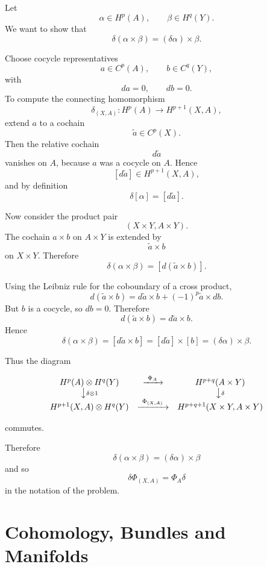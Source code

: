 \begin{solution}
Let
\[
\alpha\in H^p(A),
\qquad
\beta\in H^q(Y).
\]
We want to show that
\[
\delta(\alpha\times \beta)
=
(\delta\alpha)\times \beta.
\]

Choose cocycle representatives
\[
a\in C^p(A),
\qquad
b\in C^q(Y),
\]
with
\[
da=0,
\qquad
db=0.
\]
To compute the connecting homomorphism
\[
\delta_{(X,A)}:H^p(A)\to H^{p+1}(X,A),
\]
extend \(a\) to a cochain
\[
\widetilde a\in C^p(X).
\]
Then the relative cochain
\[
d\widetilde a
\]
vanishes on \(A\), because \(a\) was a cocycle on \(A\). Hence
\[
[d\widetilde a]\in H^{p+1}(X,A),
\]
and by definition
\[
\delta[\alpha]=[d\widetilde a].
\]

Now consider the product pair
\[
(X\times Y,A\times Y).
\]
The cochain \(a\times b\) on \(A\times Y\) is extended by
\[
\widetilde a\times b
\]
on \(X\times Y\). Therefore
\[
\delta(\alpha\times \beta)
=
[d(\widetilde a\times b)].
\]

Using the Leibniz rule for the coboundary of a cross product,
\[
d(\widetilde a\times b)
=
d\widetilde a\times b
+
(-1)^p\widetilde a\times db.
\]
But \(b\) is a cocycle, so \(db=0\). Therefore
\[
d(\widetilde a\times b)
=
d\widetilde a\times b.
\]
Hence
\[
\delta(\alpha\times \beta)
=
[d\widetilde a\times b]
=
[d\widetilde a]\times [b]
=
(\delta\alpha)\times \beta.
\]

Thus the diagram



\[
\begin{array}{ccc}
H^p(A)\otimes H^q(Y)
&\xrightarrow{\ \Phi_A\ }&
H^{p+q}(A\times Y)\\
\big\downarrow{\scriptstyle \delta\otimes 1}
&&
\big\downarrow{\scriptstyle \delta}\\
H^{p+1}(X,A)\otimes H^q(Y)
&\xrightarrow{\ \Phi_{(X,A)}\ }&
H^{p+q+1}(X\times Y,A\times Y)
\end{array}
\]



commutes.

Therefore
\[
\boxed{
	\delta(\alpha\times\beta)
	=
	(\delta\alpha)\times\beta
}
\]
and so
\[
\boxed{
	\delta\Phi_{(X,A)}
	=
	\Phi_A\delta
}
\]
in the notation of the problem.
\end{solution}

\section{Cohomology, Bundles and Manifolds}

